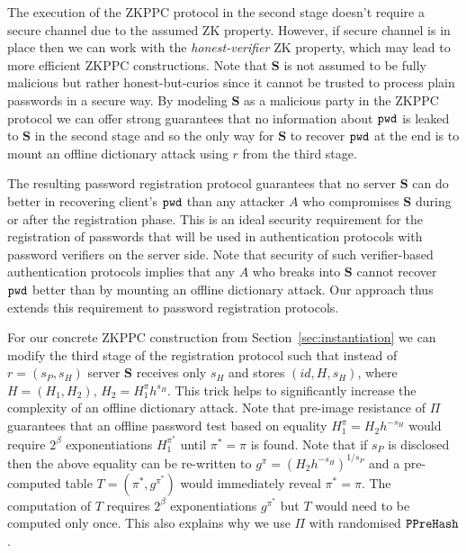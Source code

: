 The execution of the ZKPPC protocol in the second stage doesn't require a secure channel due to the assumed ZK property. However, if secure channel is in place then we can work with the \emph{honest-verifier} ZK property, which may lead to more efficient ZKPPC constructions. Note that $\bm{S}$ is not assumed to be fully malicious but rather honest-but-curios since it cannot be trusted to process plain passwords in a secure way. By modeling $\bm{S}$ as a malicious party in the ZKPPC protocol we can offer strong guarantees that no information about $\mathtt{pwd}$ is leaked to $\bm{S}$ in the second stage and so the only way for $\bm{S}$ to recover $\mathtt{pwd}$ at the end is to mount an offline dictionary attack using $r$ from the third stage.

The resulting password registration protocol guarantees that no server $\bm{S}$ can do better in recovering client's $\mathtt{pwd}$ than any attacker $A$ who compromises $\bm{S}$ during or after the registration phase. This is an ideal security requirement for the registration of passwords that will be used in authentication protocols with password verifiers on the server side. Note that security of such verifier-based authentication protocols implies that any $A$ who breaks into $\bm{S}$ cannot recover $\mathtt{pwd}$ better than by mounting an offline dictionary attack. Our approach thus extends this requirement to password registration protocols.

For our concrete ZKPPC construction from Section~\ref{sec:instantiation} we can modify the third stage of the registration protocol such that instead of $r=(s_P,s_H)$ server $\bm{S}$ receives only $s_H$ and stores $(id, H, s_H)$, where $H=(H_1, H_2)$, $H_2=H_1^\pi h^{s_H}$. This trick helps to significantly increase the complexity of an offline dictionary attack. Note that pre-image resistance of $\Pi$ guarantees that an offline password test based on equality $H_1^{\pi} = H_2h^{-s_H}$ would require $2^\beta$ exponentiations $H_1^{\pi^\ast}$ until $\pi^\ast=\pi$ is found. Note that if $s_P$ is disclosed then the above equality can be re-written to $g^{\pi} = (H_2h^{-s_H})^{1/s_P}$ and a pre-computed table $T=(\pi^\ast, g^{\pi^\ast})$ would immediately reveal $\pi^\ast=\pi$. The computation of $T$ requires $2^\beta$ exponentiations $g^{\pi^\ast}$ but $T$ would need to be computed only once. This also explains why we use $\Pi$ with randomised $\mathtt{PPreHash}$.
